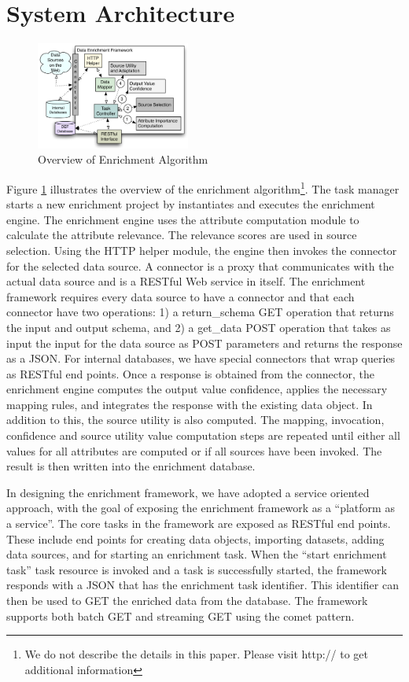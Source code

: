 \section{System Architecture}

\begin{figure}[htb]
\centering
\includegraphics[width=0.45\textwidth]{images/adef_arch.png}
\caption{Overview of Enrichment Algorithm}
\label{fig:overview}
\end{figure}

Figure \ref{fig:overview} illustrates the overview of the enrichment algorithm\footnote{We do not describe the details in this paper. Please visit http:// to get additional information}. The task manager starts a new enrichment project by instantiates and executes the enrichment engine.
The enrichment engine uses the attribute computation module to calculate the attribute relevance. The relevance scores are used in source selection. Using the HTTP helper module, the engine then invokes 
the connector for the selected data source. A connector is a proxy that communicates with the actual data source and is a RESTful Web service in itself. The enrichment framework requires every data source to have a connector and 
that each connector have two operations: 1) a return\_schema GET operation that returns the input and output schema, and 2) a get\_data POST operation that takes as input the input for the data source as POST parameters and returns 
the response as a JSON. For internal databases, we have special connectors that wrap queries as RESTful end points. 
Once a response is obtained from the connector, the enrichment engine computes the output value confidence, applies the necessary mapping rules, and integrates the response with the existing data object. In 
addition to this, the source utility is also computed. The mapping, invocation, confidence and source utility value computation steps are repeated until either all values for all attributes are computed or if all sources
have been invoked. The result is then written into the enrichment database.  

In designing the enrichment framework, we have adopted a service oriented approach, with the goal of exposing the enrichment framework as a ``platform as a service''. 
The core tasks in the framework are exposed as RESTful end points. These include end points for 
creating data objects, importing datasets, adding data sources, and for starting an enrichment task. When the ``start enrichment task'' task resource is invoked and a task is successfully started, the framework responds with a JSON 
that has the enrichment task identifier. This identifier can then be used to GET the enriched data from the database. The framework supports both batch GET and streaming GET using the comet \cite{comet} pattern. 

